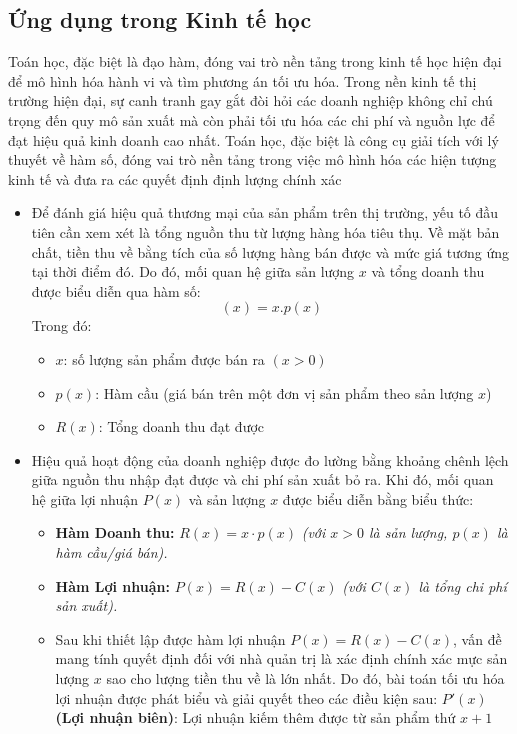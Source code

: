 \documentclass[12pt,a4paper]{article}
\begin{document}
\subsection{Ứng dụng trong Kinh tế học}
Toán học, đặc biệt là đạo hàm, đóng vai trò nền tảng trong kinh tế học hiện đại để mô hình hóa hành vi và tìm phương án tối ưu hóa.
Trong nền kinh tế thị trường hiện đại, sự canh tranh gay gắt đòi hỏi các doanh nghiệp không chỉ chú trọng đến quy mô sản xuất mà còn phải tối ưu hóa các chi phí và nguồn lực để đạt hiệu quả kinh doanh cao nhất. Toán học, đặc biệt là công cụ giải tích với lý thuyết về hàm số, đóng vai trò nền tảng trong việc mô hình hóa các hiện tượng kinh tế và đưa ra các quyết định định lượng chính xác
\begin{itemize}
    \item  Để đánh giá hiệu quả thương mại của sản phẩm trên thị trường, yếu tố đầu tiên cần xem xét là tổng nguồn thu từ lượng hàng hóa tiêu thụ. Về mặt bản chất, tiền thu về bằng tích của số lượng hàng bán được và mức giá tương ứng tại thời điểm đó. Do đó, mối quan hệ giữa sản lượng $x$ và tổng doanh thu được biểu diễn qua hàm số:
    $$(x)=x.p(x)$$
Trong đó:    
\begin{itemize}
\item[+] $x$: số lượng sản phẩm được bán ra $(x>0)$
\item[+] $p(x)$: Hàm cầu (giá bán trên một đơn vị sản phẩm theo sản lượng $x$)
\item[+] $R(x)$: Tổng doanh thu đạt được  
\end{itemize}
\item Hiệu quả hoạt động của doanh nghiệp được đo lường bằng khoảng chênh lệch giữa nguồn thu nhập đạt được và chi phí sản xuất bỏ ra. Khi đó, mối quan hệ giữa lợi nhuận  $P(x)$ và sản lượng $x$ được biểu diễn bằng biểu thức:

\begin{itemize}
    \item \textbf{Hàm Doanh thu:} $R(x) = x \cdot p(x)$ \textit{(với $x > 0$ là sản lượng, $p(x)$ là hàm cầu/giá bán).}
    \item \textbf{Hàm Lợi nhuận:} $P(x) = R(x) - C(x)$ \textit{(với $C(x)$ là tổng chi phí sản xuất).}
    \item  Sau khi thiết lập được hàm lợi nhuận $P(x)=R(x)-C(x)$, vấn đề mang tính quyết định đối với nhà quản trị là xác định chính xác mực sản lượng $x$ sao cho lượng tiền thu về là lớn nhất. Do đó, bài toán tối ưu hóa lợi nhuận được phát biểu và giải quyết theo các điều kiện sau:
    \textbf{$P'(x)$ (Lợi nhuận biên)}: Lợi nhuận kiếm thêm được từ sản phẩm thứ $x+1$


\end{itemize}
\end{itemize}
\end{document}
